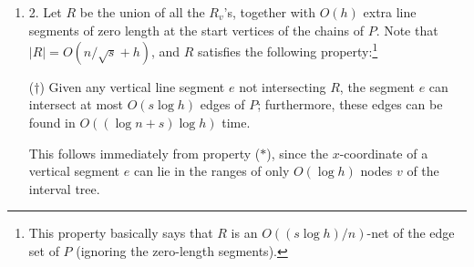 \documentclass[10pt,a4paper]{article}
\begin{document}
\begin{enumerate}
\begin{enumerate}
\par
\par
\item[]  (c) 
Compute an $s$-division of the dual of $\textit{TD}(P_{v})$ in $O(n_{v})$ time. Preprocess the regions of the $s$-division for point location [26] in linear time. Let $R_{v}$ be the subset of all $O(n_{v}/\sqrt{s})$ edges of $P_{v}$ that participate in the region boundaries in this $s$-division (this excludes vertical sides). Then $R_{v}$ obeys the following property:\footnote{This property basically says that $R_{v}$ is an $O(s/n_{v})$-net [17, 23] of the edge set of $P_{v}$, in the set system corresponding to edges intersecting vertical line segments. The size of our net ($O(n_{v}/\sqrt{s})$) isn’t the smallest possible (which would be $O(n_{v}/s)$) but is good enough for our purposes. }
\par
($\ast$) Given any vertical line segment $e$ not intersecting $R_{v}$, the segment $e$ can intersect at most $O(s)$ edges of $P_{v}$; furthermore, these edges can be found in $O(\log n+s)$ time.
\par
\par
This property is easy to see: any such segment $e$ must lie completely inside a region in the $s$-division, which can be found by point location [26] in $O(\log n)$ time, and there are at most $O(s)$ edges of $P_{v}$ participating in the region.
\par
\par
\end{enumerate}
\par
\item[]  2. 
Let $R$ be the union of all the $R_{v}$’s, together with $O(h)$ extra line segments of zero length at the start vertices of the chains of $P$. Note that $|R|=O(n/\sqrt{s}+h)$, and $R$ satisfies the following property:\footnote{This property basically says that $R$ is an $O((s\log h)/n)$-net of the edge set of $P$ (ignoring the zero-length segments). }
\par
(${\dagger}$) Given any vertical line segment $e$ not intersecting $R$, the segment $e$ can intersect at most $O(s\log h)$ edges of $P$; furthermore, these edges can be found in $O((\log n+s)\log h)$ time.
\par
\par
This follows immediately from property ($\ast$), since the $x$-coordinate of a vertical segment $e$ can lie in the ranges of only $O(\log h)$ nodes $v$ of the interval tree.
\par
\par

\end{enumerate}
\end{document}
